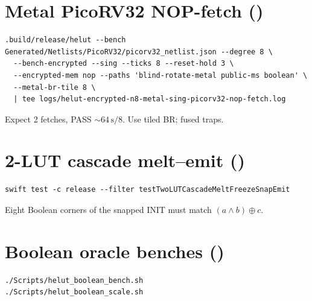 \section{Metal PicoRV32 NOP-fetch ()}

\begin{lstlisting}
.build/release/helut --bench Generated/Netlists/PicoRV32/picorv32_netlist.json --degree 8 \
  --bench-encrypted --sing --ticks 8 --reset-hold 3 \
  --encrypted-mem nop --paths 'blind-rotate-metal public-ms boolean' \
  --metal-br-tile 8 \
  | tee logs/helut-encrypted-n8-metal-sing-picorv32-nop-fetch.log
\end{lstlisting}

Expect 2 fetches, PASS ${\sim}64\,\mathrm{s}/8$. Use tiled BR; fused traps.

\section{2-LUT cascade melt--emit ()}

\begin{lstlisting}
swift test -c release --filter testTwoLUTCascadeMeltFreezeSnapEmit
\end{lstlisting}

Eight Boolean corners of the snapped INIT must match $(a\land b)\oplus c$.

\section{Boolean oracle benches ()}

\begin{lstlisting}
./Scripts/helut_boolean_bench.sh
./Scripts/helut_boolean_scale.sh
\end{lstlisting}
